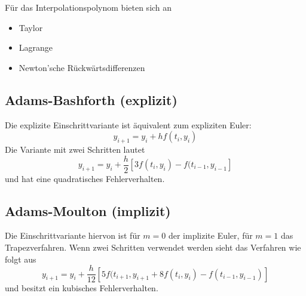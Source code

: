 Für das Interpolationspolynom bieten sich an
\begin{itemize}
\item Taylor
\item Lagrange
\item Newton'sche Rückwärtsdifferenzen
\end{itemize}

\subsection{Adams-Bashforth (explizit)}
Die explizite Einschrittvariante ist äquivalent zum expliziten Euler:
\begin{equation}
y_{i + 1} = y_i + h f(t_i, y_i)
\end{equation}
Die Variante mit zwei Schritten lautet
\begin{equation}
y_{i + 1} = y_i + \frac{h}{2} \left[ 3 f(t_i, y_i) - f(t_{i - 1}, y_{i - 1} \right]
\end{equation}
und hat eine quadratisches Fehlerverhalten.

\subsection{Adams-Moulton (implizit)}
Die Einschrittvariante hiervon ist für $m = 0$ der implizite Euler, für $m = 1$ das Trapezverfahren. Wenn zwei Schritten verwendet werden sieht das Verfahren wie folgt aus
\begin{equation}
y_{i + 1} = y_i + \frac{h}{12} \left[ 5 f(t_{i + 1}, y_{i + 1} + 8 f(t_i, y_i) - f(t_{i - 1}, y_{i - 1}) \right]
\end{equation}
und besitzt ein kubisches Fehlerverhalten. 

